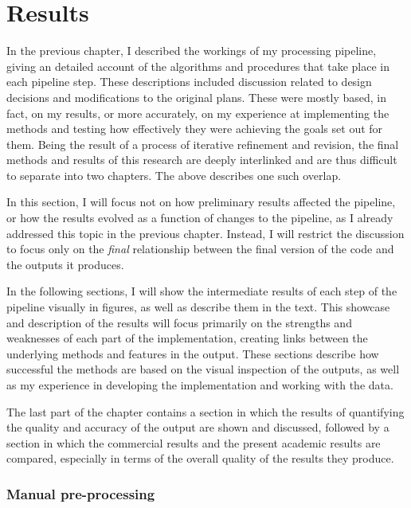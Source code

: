 
\chapter{Results}
\label{chap:r}

In the previous chapter, I described the workings of my processing pipeline, giving an detailed account of the algorithms and procedures that take place in each pipeline step. These descriptions included discussion related to design decisions and modifications to the original plans. These were mostly based, in fact, on my results, or more accurately, on my experience at implementing the methods and testing how effectively they were achieving the goals set out for them. Being the result of a process of iterative refinement and revision, the final methods and results of this research are deeply interlinked and are thus difficult to separate into two chapters. The above describes one such overlap.

In this section, I will focus not on how preliminary results affected the pipeline, or how the results evolved as a function of changes to the pipeline, as I already addressed this topic in the previous chapter. Instead, I will restrict the discussion to focus only on the \textit{final} relationship between the final version of the code and the outputs it produces.

In the following sections, I will show the intermediate results of each step of the pipeline visually in figures, as well as describe them in the text. This showcase and description of the results will focus primarily on the strengths and weaknesses of each part of the implementation, creating links between the underlying methods and features in the output. These sections describe how successful the methods are based on the visual inspection of the outputs, as well as my experience in developing the implementation and working with the data.

The last part of the chapter contains a section in which the results of quantifying the quality and accuracy of the output are shown and discussed, followed by a section in which the commercial results and the present academic results are compared, especially in terms of the overall quality of the results they produce.

\subsection{Manual pre-processing}
\label{sub:manualpreprocessing}

